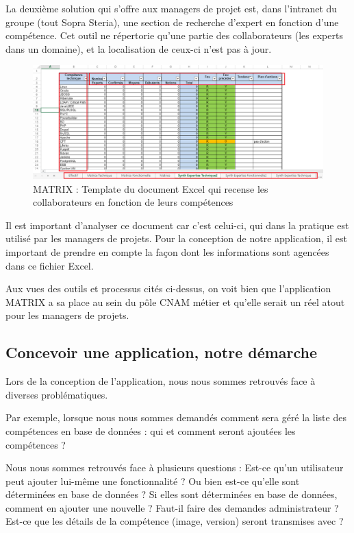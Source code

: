 La deuxième solution qui s'offre aux managers de projet est, dans l'intranet du groupe (tout Sopra Steria), une section de recherche d'expert en fonction d'une compétence. Cet outil ne répertorie qu'une partie des collaborateurs (les experts dans un domaine), et la localisation de ceux-ci n'est pas à jour.

\begin{figure}[!h]
\centering
\includegraphics[width=1\textwidth]{images/MATRIX-excel.png}
\caption{MATRIX : Template du document Excel qui recense les collaborateurs en fonction de leurs compétences}
\end{figure}

Il est important d'analyser ce document car c'est celui-ci, qui dans la pratique est utilisé par les managers de projets. Pour la conception de notre application, il est important de prendre en compte la façon dont les informations sont agencées dans ce fichier Excel.

Aux vues des outils et processus cités ci-dessus, on voit bien que l'application MATRIX a sa place au sein du pôle CNAM métier et qu'elle serait un réel atout pour les managers de projets.

\subsection{Concevoir une application, notre démarche}

Lors de la conception de l'application, nous nous sommes retrouvés face à diverses problématiques. 

Par exemple, lorsque nous nous sommes demandés comment sera géré la liste des compétences en base de données : qui et comment seront ajoutées les compétences ?

Nous nous sommes retrouvés face à plusieurs questions : Est-ce qu'un utilisateur peut ajouter lui-même une fonctionnalité ? Ou bien est-ce qu'elle sont déterminées en base de données ? Si elles sont déterminées en base de données, comment en ajouter une nouvelle ? Faut-il faire des demandes administrateur ? Est-ce que les détails de la compétence (image, version) seront transmises avec ?

